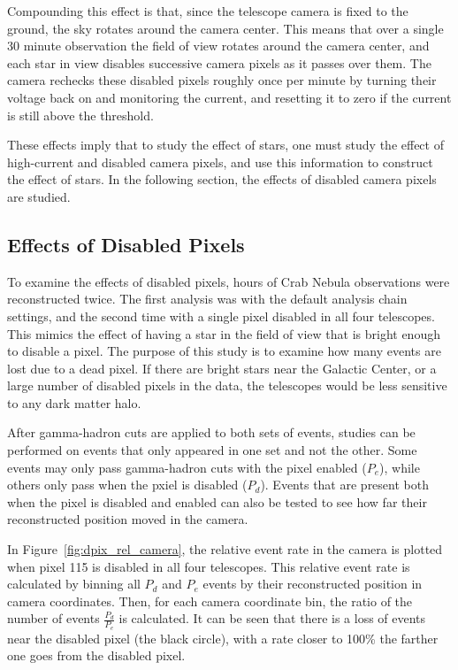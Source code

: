     Compounding this effect is that, since the telescope camera is fixed to the ground, the sky rotates around the camera center.
    This means that over a single 30 minute observation the field of view rotates around the camera center, and each star in view disables successive camera pixels as it passes over them.
    The camera rechecks these disabled pixels roughly once per minute by turning their voltage back on and monitoring the current, and resetting it to zero if the current is still above the threshold.

    These effects imply that to study the effect of stars, one must study the effect of high-current and disabled camera pixels, and use this information to construct the effect of stars.
    In the following section, the effects of disabled camera pixels are studied.
    
  \subsection{Effects of Disabled Pixels}


    To examine the effects of disabled pixels,  hours of Crab Nebula observations were reconstructed twice.
    The first analysis was with the default analysis chain settings, and the second time with a single pixel disabled in all four telescopes.
    This mimics the effect of having a star in the field of view that is bright enough to disable a pixel.
    The purpose of this study is to examine how many events are lost due to a dead pixel.
    If there are bright stars near the Galactic Center, or a large number of disabled pixels in the data, the telescopes would be less sensitive to any dark matter halo.

    After gamma-hadron cuts are applied to both sets of events, studies can be performed on events that only appeared in one set and not the other.
    Some events may only pass gamma-hadron cuts with the pixel enabled ($P_e$), while others only pass when the pxiel is disabled ($P_d$).
    Events that are present both when the pixel is disabled and enabled can also be tested to see how far their reconstructed position moved in the camera.

    In Figure~\ref{fig:dpix_rel_camera}, the relative event rate in the camera is plotted when pixel 115 is disabled in all four telescopes.
    This relative event rate is calculated by binning all $P_d$ and $P_e$ events by their reconstructed position in camera coordinates.
    Then, for each camera coordinate bin, the ratio of the number of events $\frac{P_d}{P_e}$ is calculated.
    It can be seen that there is a loss of events near the disabled pixel (the black circle), with a rate closer to 100\% the farther one goes from the disabled pixel.

